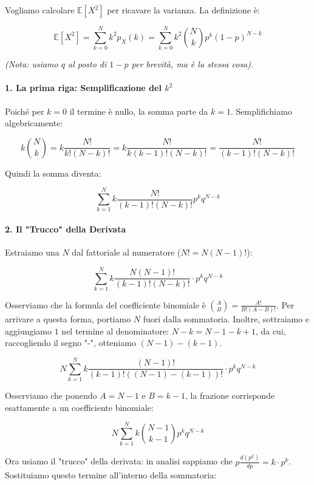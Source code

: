 Vogliamo calcolare $\mathbb{E}[X^2]$ per ricavare la varianza. La definizione è:

\[ \mathbb{E}[X^2] = \sum_{k=0}^{N} k^2 p_X(k) = \sum_{k=0}^{N} k^2 \binom{N}{k} p^k (1-p)^{N-k} \]

\textit{(Nota: usiamo $q$ al posto di $1-p$ per brevità, ma è la stessa cosa).}

\paragraph{1. La prima riga: Semplificazione del $k^2$}
Poiché per $k=0$ il termine è nullo, la somma parte da $k=1$. Semplifichiamo algebricamente:

\[
k \binom{N}{k} = k \frac{N!}{k!(N-k)!} = k \frac{N!}{k(k-1)!(N-k)!} = \frac{N!}{(k-1)!(N-k)!}  \tag{a}
\] 

Quindi la somma diventa:

\[
\sum_{k=1}^{N} k \frac{N!}{(k-1)!(N-k)!} p^k q^{N-k}
\]
\paragraph{2. Il "Trucco" della Derivata}


Estraiamo una $N$ dal fattoriale al numeratore ($N! = N(N-1)!$):

\begin{equation}
    \sum_{k=1}^{N} k \frac{N(N-1)!}{(k-1)!(N-k)!} \cdot p^k q^{N-k} \tag{b}
\end{equation}

Osserviamo che la formula del coefficiente binomiale è $\binom{A}{B} = \frac{A!}{B!(A-B)!}$. Per arrivare a questa forma, portiamo $N$ fuori dalla sommatoria. Inoltre, sottraiamo e aggiungiamo $1$ nel termine al denominatore: $N-k = N-1-k+1$, da cui, raccogliendo il segno "-", otteniamo $(N-1)-(k-1)$.

\begin{equation}
    N \sum_{k=1}^{N} k \frac{(N-1)!}{(k-1)!((N-1)-(k-1))!} \cdot p^k q^{N-k} \tag{c}
\end{equation}

Osserviamo che ponendo $A = N-1$ e $B = k-1$, la frazione corrisponde esattamente a un coefficiente binomiale:

\begin{equation}
    N \sum_{k=1}^{N} k \binom{N-1}{k-1} p^k q^{N-k} \tag{d}
\end{equation}

Ora usiamo il "trucco" della derivata: in analisi sappiamo che $p \frac{d(p^k)}{dp} = k \cdot p^k$. Sostituiamo questo termine all'interno della sommatoria:

